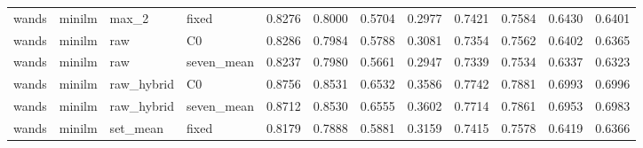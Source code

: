 \begin{longtable}{llllrrrrrrrr}
wands & minilm & max\_2 & fixed & 0.8276 & 0.8000 & 0.5704 & 0.2977 & 0.7421 & 0.7584 & 0.6430 & 0.6401 \\
wands & minilm & raw & C0 & 0.8286 & 0.7984 & 0.5788 & 0.3081 & 0.7354 & 0.7562 & 0.6402 & 0.6365 \\
wands & minilm & raw & seven\_mean & 0.8237 & 0.7980 & 0.5661 & 0.2947 & 0.7339 & 0.7534 & 0.6337 & 0.6323 \\
wands & minilm & raw\_hybrid & C0 & 0.8756 & 0.8531 & 0.6532 & 0.3586 & 0.7742 & 0.7881 & 0.6993 & 0.6996 \\
wands & minilm & raw\_hybrid & seven\_mean & 0.8712 & 0.8530 & 0.6555 & 0.3602 & 0.7714 & 0.7861 & 0.6953 & 0.6983 \\
wands & minilm & set\_mean & fixed & 0.8179 & 0.7888 & 0.5881 & 0.3159 & 0.7415 & 0.7578 & 0.6419 & 0.6366 \\
\end{longtable}
